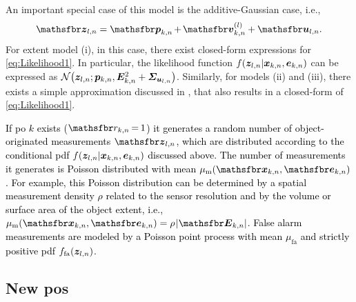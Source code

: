\documentclass[10pt, twoside, romanappendices]{IEEEtran}
\providecommand{\rd}{\textcolor{black}}
\providecommand{\ist}{\hspace*{.3mm}}
\providecommand{\rmv}{\hspace*{-.3mm}}
\begin{document}
An important special case of this model is the additive-Gaussian \vspace{.8mm} case, i.e.,
\begin{equation}
\RV{z}_{l,n} = \RV{p}_{k,n} \rmv+\rmv \RV{v}^{(l)}_{k,n} + \RV{u}_{l,n}. \label{eq:measModelLin}
\vspace{.8mm}
\end{equation}
For extent model (i), in this case, there exist closed-form expressions for  \eqref{eq:Likelihood1}. In particular, the likelihood function $f(\bm{z}_{l,n} | \bm{x}_{k,n}, \bm{e}_{k,n})$ can be expressed as $\mathcal{N}\big(\V{z}_{l,n};\V{p}_{k,n}, \M{E}^2_{k,n} + \M{\Sigma}_{\V{u}_{l,n}}\big)$. Similarly, for models (ii) and (iii), there exists a simple approximation discussed in \cite[Section~2]{MeyWil:SM21}, that also results in a closed-form of \eqref{eq:Likelihood1}. 

\rd{If \ac{po} $k$ exists ($\rv{r}_{k,n} \rmv=\rmv 1$) it generates a random number of object-originated measurements $\RV{z}_{l,n}$, which are distributed according to the conditional \ac{pdf} $f(\bm{z}_{l,n}|\bm{x}_{k,n}, \bm{e}_{k,n})$ discussed above. The number of measurements it generates is Poisson distributed with mean $\mu_{\mathrm{m}}(\RV{x}_{k,n},\RV{e}_{k,n})$. For example, this Poisson distribution can be determined by a spatial measurement density $\rho$ related to the sensor resolution and by the volume or surface area of the object extent, i.e., $\mu_{\mathrm{m}}(\RV{x}_{k,n},\RV{e}_{k,n}) = \rho \ist | \RM{E}_{k,n} |$. False alarm measurements  are modeled by a Poisson point process with mean $\mu_{\mathrm{fa}}$ and strictly positive \ac{pdf} $f_{\mathrm{fa}}(\bm{z}_{l,n})$.}




\subsection{New \acp{po}  \vspace{-.6mm}}
\label{sec:MeasNewPOs}
\end{document}
